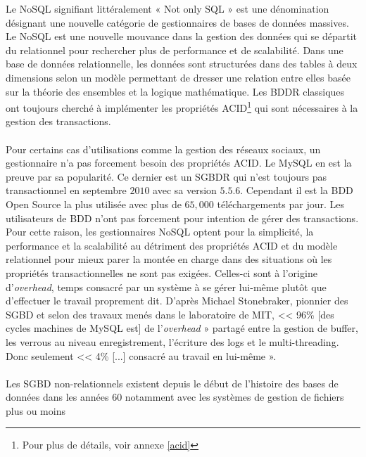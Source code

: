 Le \textsf{NoSQL} signifiant littéralement « \textsf{Not only SQL} »
est une dénomination désignant une nouvelle catégorie de gestionnaires
de bases de données massives. Le \textsf{NoSQL} est une nouvelle
mouvance dans la gestion des données qui se départit du relationnel 
pour rechercher plus de performance et de scalabilité\cite{RickCattell}. Dans une
base de données relationnelle, les données sont structurées dans des
tables à deux dimensions selon un modèle permettant de dresser une
relation entre elles basée sur la théorie des ensembles et la logique
mathématique\cite{BDDR}. Les \textsf{BDDR} classiques ont toujours cherché à
implémenter les propriétés \textsf{ACID}\footnote{Pour plus de détails, voir annexe
  \ref{acid}}\cite{DanielBartholomew} qui sont nécessaires à la gestion des
transactions.  
\\ 
\\ 
Pour certains cas d'utilisations comme la gestion des réseaux sociaux,
un gestionnaire n'a pas forcement besoin des
propriétés \textsf{ACID}. Le
\textsf{MySQL} en est la preuve par sa popularité. Ce dernier est un \textsf{SGBDR} qui n'est toujours  
pas transactionnel en septembre $2010$ avec sa version $5.5.6$\cite{MySQLACID}. Cependant il est la \textsf{BDD} \textsf{Open Source} la
plus utilisée avec plus de $65,000$ téléchargements par
jour\cite{siteMySQL}. Les utilisateurs de \textsf{BDD} n'ont pas
forcement pour intention de gérer des transactions. Pour cette raison,
les gestionnaires \textsf{NoSQL} optent pour la simplicité, la
performance et la scalabilité au détriment des propriétés
\textsf{ACID} et du modèle relationnel pour mieux parer la montée en
charge dans des situations où les propriétés transactionnelles ne sont
pas exigées. Celles-ci sont à l'origine d'\textit{overhead}, temps
consacré par un système à se gérer lui-même plutôt que d'effectuer le
travail proprement dit. D'après \textsf{Michael Stonebraker}, pionnier
des \textsf{SGBD} et selon des travaux menés dans le laboratoire
de \textsf{MIT}, << 96\% [des cycles machines de \textsf{MySQL} est] de
l’\textit{overhead} » partagé entre la gestion de \textsf{buffer}, les
verrous au niveau enregistrement, l’écriture des \textsf{logs} et
le \textsf{multi-threading}. Donc seulement << 4\% [...] consacré au
travail en lui-même »\cite{MichaelStonebraker}.
\\ 
\\ 
Les \textsf{SGBD} non-relationnels existent depuis
le début de l'histoire des bases de données dans les années $60$
notamment avec les systèmes de gestion de fichiers plus ou moins
